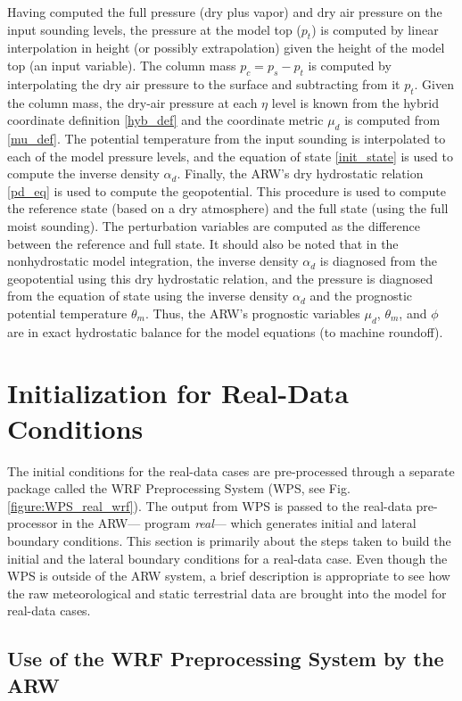 Having computed the full pressure (dry plus vapor) and dry air pressure
on the input sounding levels, the pressure at the model top ($p_{t}$)
is computed by linear interpolation in height (or possibly
extrapolation) given the height of the model top (an input variable).
The column mass $p_c=p_s-p_t$ is computed by interpolating the dry air
pressure to the surface and subtracting from it $p_{t}$.  Given the
column mass, the dry-air pressure at each $\eta$ level is known from the
hybrid coordinate definition \eqref{hyb_def} and the coordinate metric 
$\mu_d$ is computed from \eqref{mu_def}.
The potential temperature from the input sounding is interpolated to
each of the model pressure levels, and the equation of state
\eqref{init_state} is used to compute the inverse density 
$\alpha_d$.  Finally, the 
ARW's dry hydrostatic relation \eqref{pd_eq}
is used to compute the geopotential.  This procedure is used to compute
the reference state (based on a dry atmosphere) and the full state
(using the full moist sounding).  The perturbation variables are
computed as the difference between the reference and full state.  It
should also be noted that in the nonhydrostatic model integration,
the inverse density $\alpha_d$ is diagnosed from the geopotential using
this dry hydrostatic relation, and the pressure is diagnosed from the equation
of state using the inverse density $\alpha_d$ and the prognostic potential
temperature $\theta_m$.  Thus, the ARW's prognostic variables $\mu_d$,
$\theta_m$, and $\phi$ are in exact hydrostatic balance for the model
equations (to machine roundoff).

\section{Initialization for Real-Data Conditions}

The initial conditions for the real-data cases are pre-processed through a separate 
package called the WRF Preprocessing System (WPS, see Fig. \ref{figure:WPS_real_wrf}).  
The output from WPS is passed to the 
real-data pre-processor in the ARW--- program {\it real}--- which generates initial and lateral boundary
conditions.  This section is primarily about the steps taken to build the
initial and the lateral boundary conditions for a real-data case.  Even though the
WPS is outside of the ARW system, a brief description is appropriate to see how the 
raw meteorological and static terrestrial data are brought into the model
for real-data cases.

\subsection{Use of the WRF Preprocessing System by the ARW}

